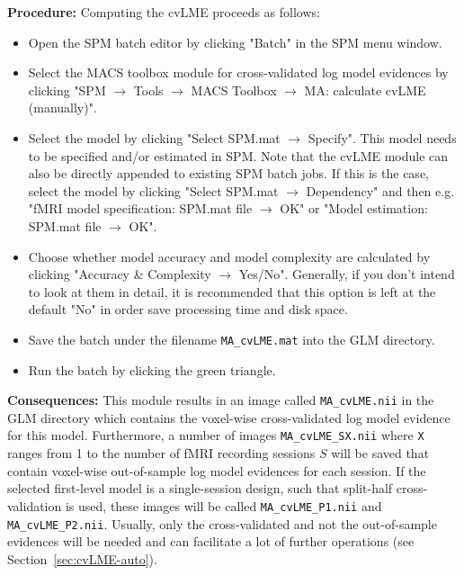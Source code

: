 \documentclass[a4paper,12pt]{article}
\newcommand{\ra}{$\rightarrow$ }
\begin{document}
\textbf{Procedure:} Computing the cvLME proceeds as follows:
\begin{itemize}
	
\item
Open the SPM batch editor by clicking "Batch" in the SPM menu window.

\item
Select the MACS toolbox module for cross-validated log model evidences by clicking "SPM \ra Tools \ra MACS Toolbox \ra MA: calculate cvLME (manually)".

\item
Select the model by clicking "Select SPM.mat \ra Specify". This model needs to be specified and/or estimated in SPM. Note that the cvLME module can also be directly appended to existing SPM batch jobs. If this is the case, select the model by clicking "Select SPM.mat \ra Dependency" and then e.g. "fMRI model specification: SPM.mat file \ra OK" or "Model estimation: SPM.mat file \ra OK".

\item
Choose whether model accuracy and model complexity are calculated by clicking "Accuracy \& Complexity \ra Yes/No". Generally, if you don't intend to look at them in detail, it is recommended that this option is left at the default "No" in order save processing time and disk space.

\item
Save the batch under the filename \texttt{MA\_cvLME.mat} into the GLM directory.

\item
Run the batch by clicking the green triangle.
	
\end{itemize}

\textbf{Consequences:} This module results in an image called \texttt{MA\_cvLME.nii} in the GLM directory which contains the voxel-wise cross-validated log model evidence for this model. Furthermore, a number of images \texttt{MA\_cvLME\_SX.nii} where \texttt{X} ranges from 1 to the number of fMRI recording sessions $S$ will be saved that contain voxel-wise out-of-sample log model evidences for each session. If the selected first-level model is a single-session design, such that split-half cross-validation is used, these images will be called \texttt{MA\_cvLME\_P1.nii} and \texttt{MA\_cvLME\_P2.nii}. Usually, only the cross-validated and not the out-of-sample evidences will be needed and can facilitate a lot of further operations (see Section~\ref{sec:cvLME-auto}).
\end{document}

